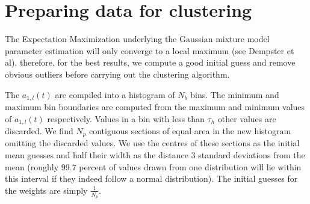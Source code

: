 \section{Preparing data for clustering \label{sec:amfmseppreparecluster}}
The Expectation Maximization underlying the Gaussian mixture model parameter
estimation will only converge to a local maximum (see Dempster et al),
therefore, for the best results, we compute a good initial guess and remove
obvious outliers before carrying out the clustering algorithm.

The $a_{1,l}(t)$ are compiled into a histogram of $N_{b}$ bins. The minimum and
maximum bin boundaries are computed from the maximum and minimum values of
$a_{1,l}(t)$ respectively. Values in a bin with less than $\tau_{h}$ other
values are discarded. We find $N_{p}$ contiguous sections of equal area in the
new histogram omitting the discarded values.  We use the centres of these
sections as the initial mean guesses and half their width as the distance 3
standard deviations from the mean (roughly 99.7 percent of values drawn from one
distribution will lie within this interval if they indeed follow a normal
distribution). The initial guesses for the weights are simply $\frac{1}{N_{p}}$.

